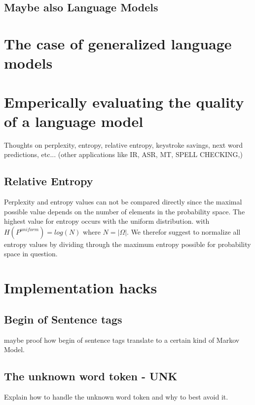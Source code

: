 \documentclass[•]{book}
\begin{document}
\section{Maybe also Language Models}


\chapter{The case of generalized language models}

\chapter{Emperically evaluating the quality of a language model}
Thoughts on perplexity, entropy, relative entropy, keystroke savings, next word predictions, etc... (other applications like IR, ASR, MT, SPELL CHECKING,) 

\section{Relative Entropy}
Perplexity and entropy values can not be compared directly since the maximal possible value depends on the number of elements in the probability space.
The highest value for entropy occurs with the uniform distribution. with $H(P^{uniform})=log(N)$ where $N = |\Omega|$. 
We therefor suggest to normalize all entropy values by dividing through the maximum entropy possible for probability space in question. 

\chapter{Implementation hacks}
\section{Begin of Sentence tags}
maybe proof how begin of sentence tags translate to a certain kind of Markov Model. 
\section{The unknown word token - UNK}
Explain how to handle the unknown word token and why to best avoid it. 
\end{document}

